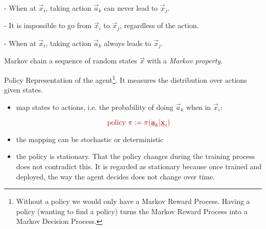 \begin{frame}
\pause

- When at $\vec x_i$, taking action $\vec a_k$ can never lead to $\vec x_j$.



\pause

- It is impossible to go from $\vec x_i$ to $\vec x_j$, regardless of the action.


\pause

- When at $\vec x_i$, taking action $\vec a_k$ always leads to $\vec x_j$.

\end{frame}

\begin{frame}


\begin{block}{Markov chain}
a sequence of random states $\vec x$ with a \emph{Markov property}.
\end{block}


\end{frame}

\begin{frame}

\begin{block}{\textcolor{policy}{Policy}}
Representation of the agent\footnote{
Without a policy we would only have a Markov Reward Process.
Having a policy (wanting to find a policy) turns the Markov Reward Process into a Markov Decision Process.
}. It measures the distribution over actions given states.
\begin{itemize}
\item map states to actions, i.e. the probability of doing $\vec a_k$ when in $\vec x_i$:

\begin{equation}
\color{policy}
\text{policy }\pi := \pi(\vec a_k | \vec x_i)
\end{equation}
\item the mapping can be stochastic or deterministic
\item the policy is stationary. That the policy changes during the training process does not contradict this.
It is regarded as stationary because once trained and deployed, the way the agent decides does not change over time.
\end{itemize}

\end{block}

\end{frame}
